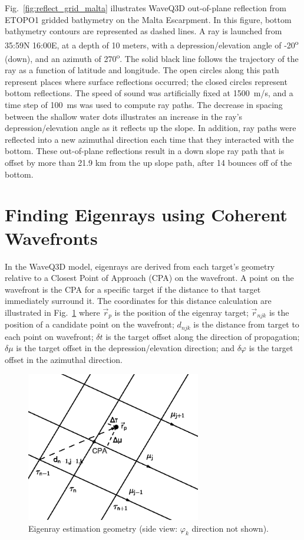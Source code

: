 \documentclass{ws-jca}
\begin{document}
Fig.~\ref{fig:reflect_grid_malta} illustrates WaveQ3D out-of-plane reflection from ETOPO1 gridded bathymetry\cite{ETOPO1} on the Malta Escarpment. In this figure, bottom bathymetry contours are represented as dashed lines. A ray is launched from 35:59N 16:00E, at a depth of 10 meters, with a
depression/elevation angle of -20\textsuperscript{o} (down), and an azimuth
of 270\textsuperscript{o}. The solid black line follows the trajectory of
the ray as a function of latitude and longitude. The open circles along
this path represent places where surface reflections occurred; the closed
circles represent bottom reflections. The speed of sound was artificially
fixed at 1500~m/s, and a time step of 100~ms was used to compute ray paths.
The decrease in spacing between the shallow water dots illustrates an
increase in the ray's depression/elevation angle as it reflects up the slope. In addition,
ray paths were reflected into a new azimuthal direction each time that they
interacted with the bottom. These out-of-plane reflections result in a down
slope ray path that is offset by more than 21.9 km from the up slope path,
after 14 bounces off of the bottom.

\section{Finding Eigenrays using Coherent Wavefronts}

In the WaveQ3D model, eigenrays are derived from each target's geometry relative
to a Closest Point of Approach (CPA) on the wavefront. A point on the
wavefront is the CPA for a specific target if the distance to that target
immediately surround it. The coordinates for this distance calculation are illustrated
in Fig.~\ref{fig:eigenray_geometry}
where
\(\vec{r}_{p}\) is the position of the eigenray target;
\(\vec{r}_{njk}\) is the position of a candidate point on the wavefront;
\(d_{njk}\) is the distance from target to each point on wavefront;
\(\delta t\) is the target offset along the direction of propagation;
\(\delta\mu\) is the target offset in the depression/elevation direction; and 
\(\delta\varphi\) is the target offset in the azimuthal direction.
\begin{figure}[th]
	\centerline{\includegraphics[width=3in]{EigenrayGeometry.eps}} 
	\vspace*{8pt}
	\caption{Eigenray estimation geometry 
		(side view: \(\varphi_k\) direction not shown).}
	\label{fig:eigenray_geometry}
\end{figure}
\end{document}
